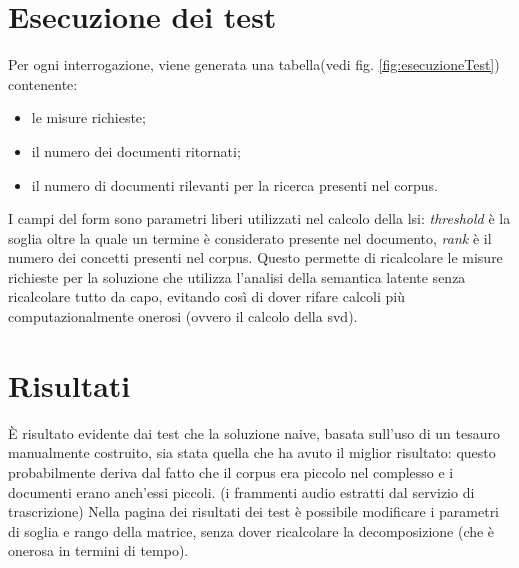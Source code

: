 \section{Esecuzione dei test}
Per ogni interrogazione, viene generata una tabella(vedi fig. \ref{fig:esecuzioneTest}) contenente:
\begin{itemize}
    \item le misure richieste;
    \item il  numero dei documenti ritornati;
    \item il numero di documenti rilevanti per la ricerca presenti nel \gls{corpus}.
\end{itemize}

I campi del form sono parametri liberi utilizzati nel calcolo della \gls{lsi}: \textit{threshold} è la soglia oltre la quale un termine è considerato presente nel documento, \textit{rank} è il numero dei concetti presenti nel \gls{corpus}. Questo permette di ricalcolare le misure richieste per la soluzione che utilizza l'analisi della semantica latente senza ricalcolare tutto da capo, evitando così di dover rifare calcoli più computazionalmente onerosi (ovvero il calcolo della \gls{svd}).


    \section{Risultati}
    È risultato evidente dai test che la soluzione naive, basata sull'uso di un tesauro manualmente costruito, sia stata quella che ha avuto il miglior risultato: questo probabilmente deriva dal fatto che il \gls{corpus} era piccolo nel complesso e i documenti erano anch'essi piccoli. (i frammenti audio estratti dal servizio di trascrizione) Nella pagina dei risultati dei test è possibile modificare i parametri di soglia e rango della matrice,  senza dover ricalcolare la decomposizione (che è onerosa in termini di tempo).

    \FloatBarrier
